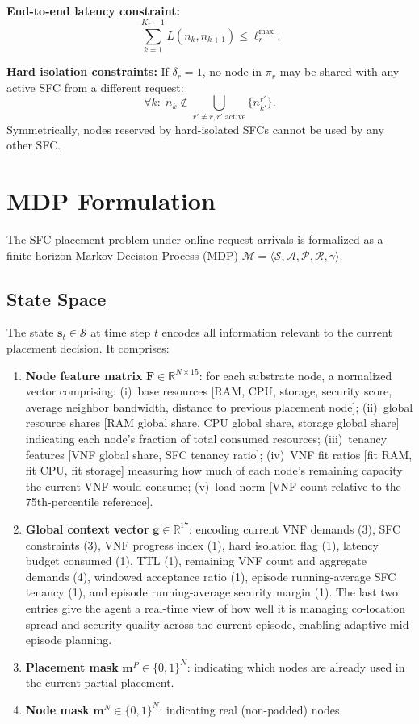 \textbf{End-to-end latency constraint:}
\begin{equation}
\sum_{k=1}^{K_r - 1} L(n_k, n_{k+1}) \leq \ell_r^{\max}.
\end{equation}

\textbf{Hard isolation constraints:} If $\delta_r = 1$, no node in $\pi_r$ may be shared with any active SFC from a different request:
\begin{equation}
\forall k:\; n_k \notin \bigcup_{r' \neq r, r' \text{ active}} \{n_{k'}^{r'}\}.
\end{equation}
Symmetrically, nodes reserved by hard-isolated SFCs cannot be used by any other SFC.

\section{MDP Formulation}

The SFC placement problem under online request arrivals is formalized as a finite-horizon Markov Decision Process (MDP) $\mathcal{M} = \langle \mathcal{S}, \mathcal{A}, \mathcal{P}, \mathcal{R}, \gamma \rangle$.

\subsection{State Space}

The state $\mathbf{s}_t \in \mathcal{S}$ at time step $t$ encodes all information relevant to the current placement decision. It comprises:

\begin{enumerate}
  \item \textbf{Node feature matrix} $\mathbf{F} \in \mathbb{R}^{N \times 15}$: for each substrate node, a normalized vector comprising: (i)~base resources [RAM, CPU, storage, security score, average neighbor bandwidth, distance to previous placement node]; (ii)~global resource shares [RAM global share, CPU global share, storage global share] indicating each node's fraction of total consumed resources; (iii)~tenancy features [VNF global share, SFC tenancy ratio]; (iv)~VNF fit ratios [fit RAM, fit CPU, fit storage] measuring how much of each node's remaining capacity the current VNF would consume; (v)~load norm [VNF count relative to the 75th-percentile reference].
  \item \textbf{Global context vector} $\mathbf{g} \in \mathbb{R}^{17}$: encoding current VNF demands (3), SFC constraints (3), VNF progress index (1), hard isolation flag (1), latency budget consumed (1), TTL (1), remaining VNF count and aggregate demands (4), windowed acceptance ratio (1), episode running-average SFC tenancy (1), and episode running-average security margin (1). The last two entries give the agent a real-time view of how well it is managing co-location spread and security quality across the current episode, enabling adaptive mid-episode planning.
  \item \textbf{Placement mask} $\mathbf{m}^{P} \in \{0,1\}^{N}$: indicating which nodes are already used in the current partial placement.
  \item \textbf{Node mask} $\mathbf{m}^{N} \in \{0,1\}^{N}$: indicating real (non-padded) nodes.
\end{enumerate}

